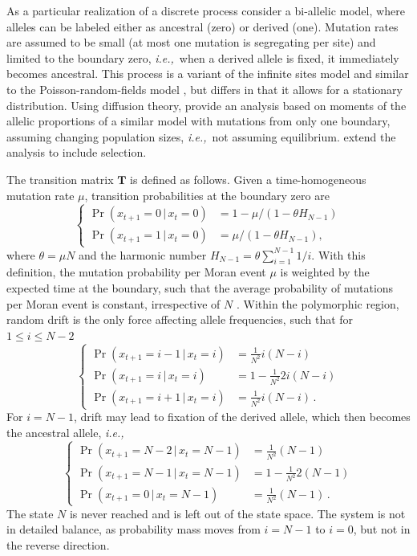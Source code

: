 \documentclass[preprint]{elsarticle}
\newcommand\given{{\,|\,}}
\newcommand\ie{{\it i.e.,}}
\newcommand\x[1]{\ensuremath{x_{#1}}}
\begin{document}
As a particular realization of a discrete process consider a bi-allelic model, where alleles can be labeled either as ancestral (zero) or derived (one). Mutation rates are assumed to be small (at most one mutation is segregating per site) and limited to the boundary zero, \ie\ when a derived allele is fixed, it immediately becomes ancestral. This process is a variant of the infinite sites model \citep{Kimu69} and similar to the Poisson-random-fields model \citep{Sawy92}, but differs in that it allows for a stationary distribution. Using diffusion theory, \citet{Evan07} provide an analysis based on moments of the allelic proportions of a similar model with mutations from only one boundary, assuming changing population sizes, \ie\ not assuming equilibrium. \citet{Zivk15} extend the analysis to include selection. 

The transition matrix $\mathbf{T}$ is defined as follows. Given a time-homogeneous mutation rate $\mu$, transition probabilities at the boundary zero are
\begin{equation}\label{eq:boundary_mutation}
\begin{cases}
\Pr(\x{t+1}=0\given \x{t}=0)&=1-\mu/(1-\theta H_{N-1})\\
\Pr(\x{t+1}=1\given \x{t}=0)&=\mu/(1-\theta H_{N-1}),
\end{cases}
\end{equation}
where $\theta=\mu N$ and the harmonic number $H_{N-1}=\theta\sum_{i=1}^{N-1}1/i$. With this definition, the mutation probability per Moran event $\mu$ is weighted by the expected time at the boundary, such that the average probability of mutations per Moran event is constant, irrespective of $N$ . Within the polymorphic region, random drift is the only force affecting allele frequencies, such that for $1\leq i \leq N-2$
\begin{equation}
\begin{cases}
\Pr(\x{t+1}=i-1\given \x{t}=i) &=\frac1{N^2} i(N-i)\\
\Pr(\x{t+1}=i\given \x{t}=i)   &=1-\frac1{N^2} 2i(N-i)\\
\Pr(\x{t+1}=i+1\given \x{t}=i) &=\frac1{N^2} i(N-i)\,.
\end{cases}
\end{equation}
For $i=N-1$, drift may lead to fixation of the derived allele, which then becomes the ancestral allele, \ie\
\begin{equation}
\begin{cases}
\Pr(\x{t+1}=N-2\given \x{t}=N-1) &=\frac1{N^2} (N-1)\\
\Pr(\x{t+1}=N-1\given \x{t}=N-1) &=1-\frac1{N^2} 2(N-1)\\
\Pr(\x{t+1}=0\given \x{t}=N-1)   &=\frac1{N^2} (N-1)\,.
\end{cases}
\end{equation}
The state $N$ is never reached and is left out of the state space. The system is not in detailed balance, as probability mass moves from $i=N-1$ to $i=0$, but not in the reverse direction.
\end{document}
